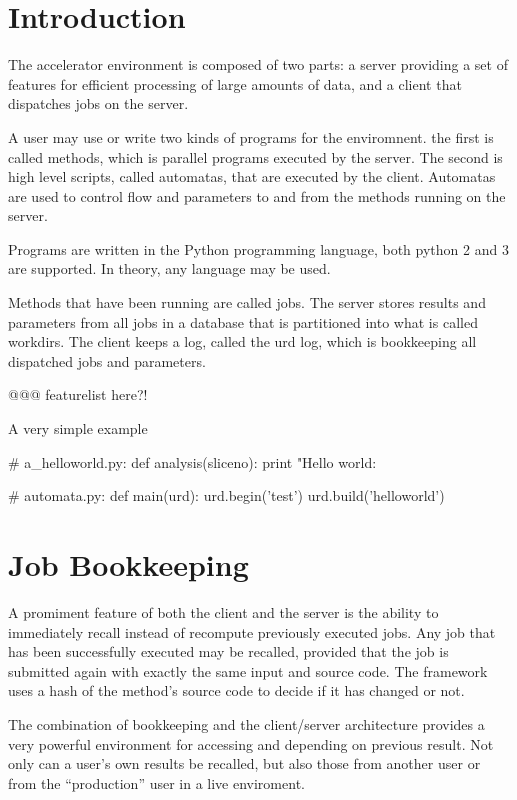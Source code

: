 
\section{Introduction}

The accelerator environment is composed of two parts: a server
providing a set of features for efficient processing of large amounts
of data, and a client that dispatches jobs on the server.

A user may use or write two kinds of programs for the enviromnent.
the first is called methods, which is parallel programs executed by
the server.  The second is high level scripts, called automatas, that
are executed by the client.  Automatas are used to control flow and
parameters to and from the methods running on the server.

Programs are written in the Python programming language, both python 2
and 3 are supported.  In theory, any language may be used.

Methods that have been running are called jobs.  The server stores
results and parameters from all jobs in a database that is partitioned
into what is called workdirs.  The client keeps a log, called the urd
log, which is bookkeeping all dispatched jobs and parameters.

@@@ featurelist here?!

A very simple example

\begin{python}
# a_helloworld.py:
def analysis(sliceno):
  print "Hello world: %

# automata.py:
def main(urd):
  urd.begin('test')
  urd.build('helloworld')
\end{python}


\section{Job Bookkeeping}

A promiment feature of both the client and the server is the ability
to immediately recall instead of recompute previously executed jobs.
Any job that has been successfully executed may be recalled, provided
that the job is submitted again with exactly the same input and source
code.  The framework uses a hash of the method's source code to decide
if it has changed or not.

The combination of bookkeeping and the client/server architecture
provides a very powerful environment for accessing and depending on
previous result.  Not only can a user's own results be recalled, but
also those from another user or from the ``production'' user in a live
enviroment.

